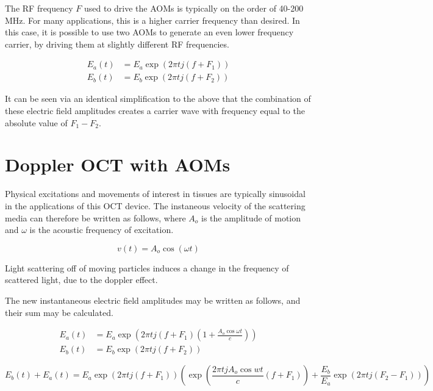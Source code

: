 The RF frequency $F$ used to drive the AOMs is typically on the order of 40-200 MHz. For many applications, this is a higher carrier frequency than desired. In this case, it is possible to use two AOMs to generate an even lower frequency carrier, by driving them at slightly different RF frequencies.

\begin{align}
E_a(t) & = E_a \exp{(2 \pi t j (f + F_1))} \\
E_b(t) & = E_b \exp{(2 \pi t j (f + F_2))}
\end{align}

It can be seen via an identical simplification to the above that the combination of these electric field amplitudes creates a carrier wave with frequency equal to the absolute value of $F_1 - F_2$.

\section{Doppler OCT with AOMs}
\label{sec:doppler_aom}


Physical excitations and movements of interest in tissues are typically sinusoidal in the applications of this OCT device. The instaneous velocity of the scattering media can therefore be written as follows, where $A_o$ is the amplitude of motion and $\omega$ is the acoustic frequency of excitation.

\begin{equation} \label{eq:media_v}
v(t) = A_o \cos{(\omega t)}
\end{equation}

Light scattering off of moving particles induces a change in the frequency of scattered light, due to the doppler effect.


The new instantaneous electric field amplitudes may be written as follows, and their sum may be calculated.

\begin{align}
E_a(t) & = E_a \exp{(2 \pi t j (f + F_1)(1 + \frac{A_o\cos{\omega t}}{c}))} \\
E_b(t) & = E_b \exp{(2 \pi t j (f + F_2))}
\end{align}

\begin{dmath}
E_b(t) + E_a(t) = E_a \exp{(2 \pi t j (f + F_1))}\left(\exp{\left(\frac{2 \pi t j A_o \cos{wt}}{c}(f + F_1)\right)} + \frac{E_b}{E_a} \exp{(2 \pi t j (F_2 - F_1))}\right)
\end{dmath}

